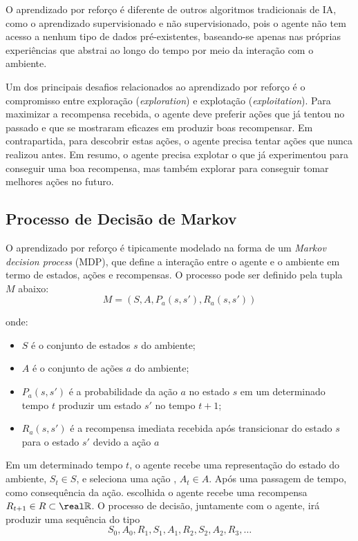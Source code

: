 O aprendizado por reforço é diferente de outros algoritmos tradicionais de IA, como o aprendizado 
supervisionado e não supervisionado, pois o agente não tem acesso a nenhum tipo de dados pré-existentes, 
baseando-se apenas nas próprias experiências que abstrai ao longo do tempo por meio da interação
com o ambiente.


Um dos principais desafios relacionados ao aprendizado por reforço é o compromisso entre exploração 
(\textit{exploration}) e explotação (\textit{exploitation}). Para maximizar a recompensa recebida, 
o agente deve preferir ações que já tentou no passado e que se mostraram eficazes em produzir
boas recompensar. Em contrapartida, para descobrir estas ações, o agente precisa tentar ações que
nunca realizou antes. Em resumo, o agente precisa explotar o que já experimentou para conseguir uma
boa recompensa, mas também explorar para conseguir tomar melhores ações no futuro.

\subsection{Processo de Decisão de Markov}
O aprendizado por reforço é tipicamente modelado na forma de um \textit{Markov decision process} (MDP),
que define a interação entre o agente e o ambiente em termo de estados, ações e recompensas.
O processo pode ser definido pela tupla \(M\) abaixo:
\begin{equation}
    M = (S, A, P_a(s, s'), R_a(s, s'))
\end{equation}

\noindent onde:
\begin{itemize}
    \item \(S\) é o conjunto de estados \(s\) do ambiente;
    \item \(A\) é o conjunto de ações \(a\) do ambiente;
    \item \(P_a(s, s')\) é a probabilidade da ação \(a\) no estado \(s\) em um determinado tempo
        \(t\) produzir um estado \(s'\) no tempo \(t+1\);
    \item \(R_a(s, s')\) é a recompensa imediata recebida após transicionar do estado \(s\) para
        o estado \(s'\) devido a ação \(a\)
\end{itemize}

Em um determinado tempo \(t\), o agente recebe uma representação do estado do ambiente, \(S_{t}\in S\),
e seleciona uma ação , \(A_{t}\in A.\) Após uma passagem de tempo, como consequência da ação.
escolhida o agente recebe uma recompensa \(R_{t+1}\in R\subset \real \mathbb{R}\).
O processo de decisão, juntamente com o agente, irá produzir uma sequência do tipo
\begin{equation}
    S_0, A_0, R_1, S_1, A_1, R_2, S_2, A_2, R_3,\ldots
\end{equation}

